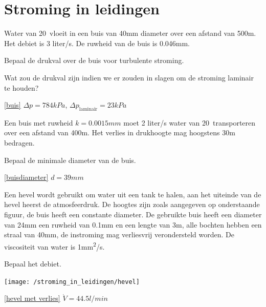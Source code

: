 \chapter{Stroming in leidingen}
\label{sec:Stroming in leidingen}
\begin{toepassing}
	\label{buis}
Water van 20\degC\ vloeit in een buis van \unit{40}{mm} diameter over een afstand van 500m. Het debiet is 3 liter/s.  De ruwheid van de buis is 0.046mm.
		
Bepaal de drukval over de buis voor turbulente stroming.
		
Wat zou de drukval zijn indien we er zouden in slagen om de stroming laminair te houden?
\end{toepassing}
\begin{antwoord}{\ref{buis}}
	$\Delta p = 784\unit{kPa}$, $\Delta p_{\text{laminair}} = 23\unit{kPa}$
\end{antwoord}
\vfill
\begin{toepassing}[*]
	\label{buisdiameter}
	Een buis met ruwheid $k = 0.0015\unit{mm}$ moet 2 liter/s water van 20\degC\ transporteren over een afstand van 400m.  Het verlies in drukhoogte mag hoogstens 30m bedragen.
		
	Bepaal de minimale diameter van de buis.
\end{toepassing}
\begin{antwoord}{\ref{buisdiameter}}
	$d = 39\unit{mm}$
\end{antwoord}
\begin{toepassing}[*]
	\label{hevel met verlies}
Een hevel wordt gebruikt om water uit een tank te halen, aan het uiteinde van de hevel heerst de atmosfeerdruk. De hoogtes zijn zoals aangegeven op onderstaande figuur, de buis heeft een constante diameter. De gebruikte buis heeft een diameter van 24mm een ruwheid van 0.1mm en een lengte van 3m, alle bochten hebben een straal van 40mm, de instroming mag verliesvrij verondersteld worden. De viscositeit van water is 1\unit{mm^2/s}.
		
Bepaal het debiet.

	\centering
	\texttt{[image: /stroming\_in\_leidingen/hevel]}
\end{toepassing}
\begin{antwoord}{\ref{hevel met verlies}}
	$\dot{V} = 44.5\unit{l/min}$
\end{antwoord}
